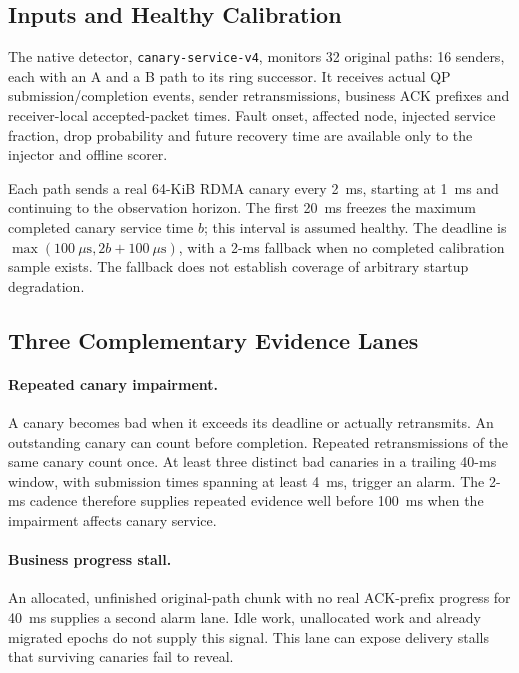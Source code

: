 \documentclass[sigconf]{acmart}
\begin{document}
\subsection{Inputs and Healthy Calibration}
The native detector, \texttt{canary-service-v4}, monitors 32 original paths:
16 senders, each with an A and a B path to its ring successor. It receives
actual QP submission/completion events, sender retransmissions, business
ACK prefixes and receiver-local accepted-packet times. Fault onset, affected
node, injected service fraction, drop probability and future recovery time
are available only to the injector and offline scorer.

Each path sends a real 64-KiB RDMA canary every 2~ms, starting at 1~ms and
continuing to the observation horizon. The first 20~ms freezes the maximum
completed canary service time $b$; this interval is assumed healthy.
The deadline is $\max(100~\mu\mathrm{s},2b+100~\mu\mathrm{s})$, with a
2-ms fallback when no completed calibration sample exists. The fallback
does not establish coverage of arbitrary startup degradation.

\subsection{Three Complementary Evidence Lanes}
\paragraph{Repeated canary impairment.}
A canary becomes bad when it exceeds its deadline or actually retransmits.
An outstanding canary can count before completion. Repeated retransmissions
of the same canary count once. At least three distinct bad canaries in a
trailing 40-ms window, with submission times spanning at least 4~ms, trigger
an alarm. The 2-ms cadence therefore supplies repeated evidence well before
100~ms when the impairment affects canary service.

\paragraph{Business progress stall.}
An allocated, unfinished original-path chunk with no real ACK-prefix
progress for 40~ms supplies a second alarm lane. Idle work, unallocated
work and already migrated epochs do not supply this signal. This lane
can expose delivery stalls that surviving canaries fail to reveal.
\end{document}
